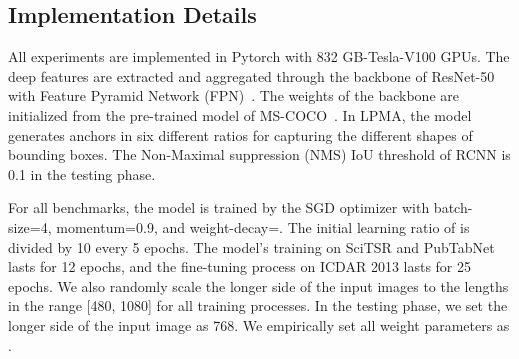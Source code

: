 \documentclass[runningheads]{llncs}
\begin{document}
\subsection{Implementation Details}
All experiments are implemented in Pytorch with 832 GB-Tesla-V100 GPUs.  The deep features are extracted and aggregated through the backbone of ResNet-50~\cite{he2016deep} with Feature Pyramid Network (FPN)~\cite{lin2017feature}. The weights of the backbone are initialized from the pre-trained model of MS-COCO~\cite{LinMBHPRDZ14}. In LPMA, the model generates anchors in six different ratios  for capturing the different shapes of bounding boxes. The Non-Maximal suppression (NMS) IoU threshold of RCNN is 0.1 in the testing phase.

For all benchmarks, the model is trained by the SGD optimizer with batch-size=4, momentum=0.9, and weight-decay=. The initial learning ratio of  is divided by 10 every 5 epochs.  The model's training on SciTSR and PubTabNet lasts for 12 epochs, and the fine-tuning process on ICDAR 2013 lasts for 25 epochs. We also randomly scale the longer side of the input images to the lengths in the range [480, 1080] for all training processes. In the testing phase, we set the longer side of the input image as 768.
We empirically set all weight parameters as .
\end{document}
